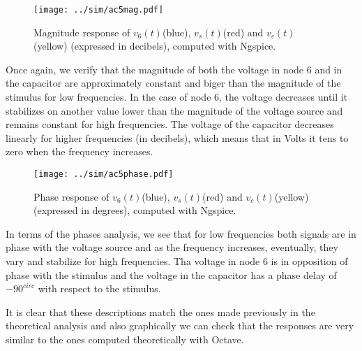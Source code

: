 \begin{figure}[H] \centering
\texttt{[image: ../sim/ac5mag.pdf]}
\caption{Magnitude response of $v_6(t)$(blue), $v_s(t)$(red) and $v_c(t)$(yellow) (expressed in decibels), computed with Ngspice.}
\label{fig:simmag}
\end{figure}

Once again, we verify that the magnitude of both the voltage in node 6 and in the capacitor are approximately constant and biger than the magnitude of the stimulus for low frequencies. In the case of node 6, the voltage decreases until it stabilizes on another value lower than the magnitude of the voltage source and remains constant for high frequencies. The voltage of the capacitor decreases linearly for higher frequencies (in decibels), which means that in Volts it tens to zero when the frequency increases.

\begin{figure}[H] \centering
\texttt{[image: ../sim/ac5phase.pdf]}
\caption{Phase response of $v_6(t)$(blue), $v_s(t)$(red) and $v_c(t)$(yellow) (expressed in degrees), computed with Ngspice.}
\label{fig:simphase}
\end{figure}

In terms of the phases analysis, we see that for low frequencies both signals are in phase with the voltage source and as the frequency increases, eventually, they vary and stabilize for high frequencies. Tha voltage in node 6 is in opposition of phase with the stimulus and the voltage in the capacitor has a phase delay of $-90^{circ}$ with respect to the stimulus.

It is clear that these descriptions match the ones made previously in the theoretical analysis and also graphically we can check that the responses are very similar to the ones computed theoretically with Octave.



